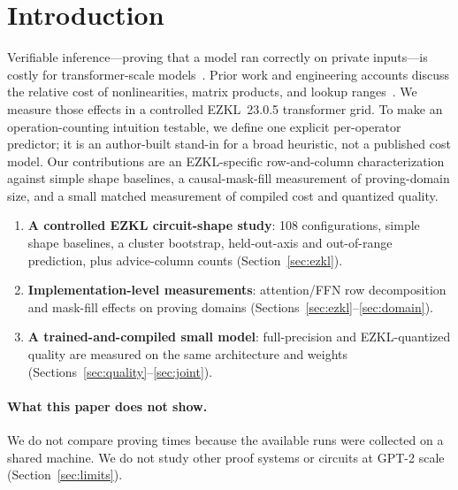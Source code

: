 \documentclass[10pt]{article}
\begin{document}
\section{Introduction}
\label{sec:intro}

Verifiable inference---proving that a model ran correctly on private
inputs---is costly for transformer-scale models~\citep{zkllm2024,zkgpt2025,nanozk2026}.
Prior work and engineering accounts discuss the relative cost of nonlinearities,
matrix products, and lookup ranges~\citep{ganescu2024,jo2026,ezklnanogpt2023,
pow2024,gupta2026,zkcostaware2026}. We measure those effects in a controlled
EZKL~23.0.5 transformer grid. To make an operation-counting intuition
testable, we define one explicit per-operator predictor; it is an author-built
stand-in for a broad heuristic, not a published cost model. Our contributions are
an EZKL-specific row-and-column characterization against simple shape baselines,
a causal-mask-fill measurement of proving-domain size, and a small matched
measurement of compiled cost and quantized quality.

\begin{enumerate}
  \item \textbf{A controlled EZKL circuit-shape study}: 108 configurations,
    simple shape baselines, a cluster bootstrap, held-out-axis and out-of-range
    prediction, plus advice-column counts (Section~\ref{sec:ezkl}).
  \item \textbf{Implementation-level measurements}: attention/FFN row
    decomposition and mask-fill effects on proving domains (Sections~\ref{sec:ezkl}--\ref{sec:domain}).
  \item \textbf{A trained-and-compiled small model}: full-precision and
    EZKL-quantized quality are measured on the same architecture and weights
    (Sections~\ref{sec:quality}--\ref{sec:joint}).
\end{enumerate}

\paragraph{What this paper does not show.}
We do not compare proving times because the available runs were collected on a
shared machine. We do not study other proof systems or circuits at GPT-2 scale
(Section~\ref{sec:limits}).

\end{document}
